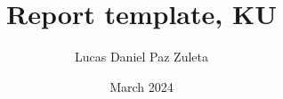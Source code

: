 
\title{Report template, KU}
\author{Lucas Daniel Paz Zuleta}
\date{March 2024}





\clearpage
{} %
\renewcommand{\contentsname}{Table of contents} %
\tableofcontents %
\clearpage

\setcounter{page}{1}




